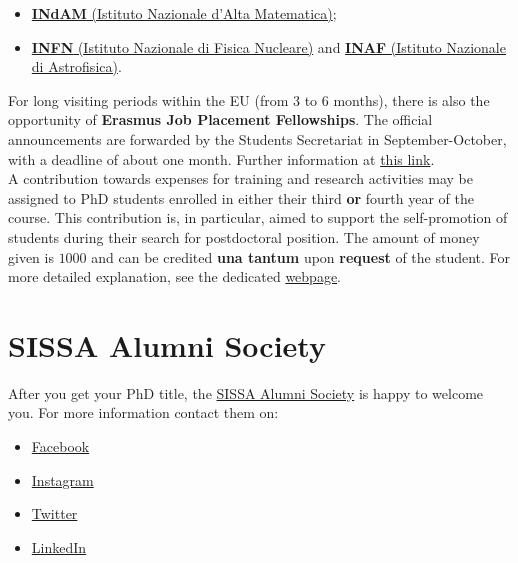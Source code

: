 \documentclass{sissavademecum}
\begin{document}
\begin{itemize}
    \item \href{http://www.altamatematica.it}{ \textbf{INdAM} (Istituto Nazionale d'Alta Matematica)};
    \item \href{http://home.infn.it/en/}{\textbf{INFN} (Istituto Nazionale di Fisica Nucleare)} and \href{http://www.inaf.it/en?set_language=en}{\textbf{INAF} (Istituto Nazionale di Astrofisica)}.
\end{itemize}

For long visiting periods within the EU (from 3 to 6 months), there is also the opportunity of \textbf{Erasmus Job Placement Fellowships}. The official announcements are forwarded by the Students Secretariat in September-October, with a deadline of about one month. Further information at \href{http://wiki.sissa.it/students/index.php/Erasmus_\%2B_Programme}{this link}. \\

A contribution towards expenses for training and research activities may be assigned to PhD students enrolled in either their third \textbf{or} fourth year of the course. This contribution is, in particular, aimed to support the self-promotion of students during their search for postdoctoral position. The amount of money given is \EUR{} $1000$ and can be credited \textbf{una tantum} upon \textbf{request} of the student. For more detailed explanation, see the dedicated \href{https://wiki.sissa.it/students/index.php/Training_and_research_contribution}{webpage}.


\section{SISSA Alumni Society}

After you get your PhD title, the \href{https://alumni.sissa.it}{SISSA Alumni Society} is happy to welcome you. For more information contact them on:
\begin{itemize}
    \item \href{https://www.facebook.com/SISSAAlumniSociety/}{Facebook}
    \item \href{https://www.instagram.com/sissaalumni/}{Instagram}
    \item \href{https://twitter.com/AlumniSissa}{Twitter}
    \item \href{https://www.linkedin.com/groups/1761097/}{LinkedIn}
\end{itemize}
\end{document}
